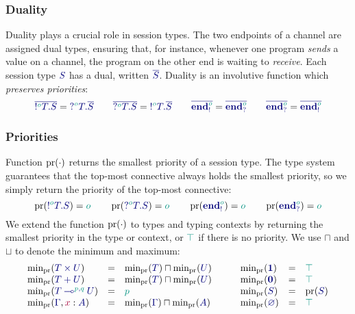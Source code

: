 \documentclass[main.tex]{subfiles}
\begin{document}
\subsubsection*{Duality}
Duality plays a crucial role in session types. The two endpoints of a channel are assigned dual types, ensuring that, for instance, whenever one program \emph{sends} a value on a channel, the program on the other end is waiting to \emph{receive}. Each session type $\ty{S}$ has a dual, written $\ty{\co{S}}$. Duality is an involutive function which \emph{preserves priorities}:
\[
  \ty{\co{\tysend[\cs{o}]{T}{S}}} = \ty{\tyrecv[\cs{o}]{T}{\co{S}}}
  \qquad
  \ty{\co{\tyrecv[\cs{o}]{T}{S}}} = \ty{\tysend[\cs{o}]{T}{\co{S}}}
  \qquad
  \ty{\co{\tyends[\cs{o}]}} = \ty{\co{\tyendr[\cs{o}]}}
  \qquad
  \ty{\co{\tyendr[\cs{o}]}} = \ty{\co{\tyends[\cs{o}]}}
\]

\subsubsection*{Priorities}
Function $\operatorname{pr}(\cdot)$ returns the smallest priority of a session type. The type system guarantees that the top-most connective always holds the smallest priority, so we simply return the priority of the top-most connective:
\[
  \pr(\ty{\tysend[\cs{o}]{T}{S}}) = \cs{o}
  \qquad
  \pr(\ty{\tyrecv[\cs{o}]{T}{S}}) = \cs{o}
  \qquad
  \pr(\ty{\tyends[\cs{o}]})       = \cs{o}
  \qquad
  \pr(\ty{\tyendr[\cs{o}]})       = \cs{o}
\]
We extend the function $\operatorname{pr}(\cdot)$ to types and typing contexts by returning the smallest priority in the type or context, or $\cs{\top}$ if there is no priority. We use $\sqcap$ and $\sqcup$ to denote the minimum and maximum:
\[
\begin{array}{lcl}
  \minpr(\ty{\typrod{T}{U}})                 & = & \minpr({\ty{T}})\sqcap\minpr({\ty{U}}) \\
  \minpr(\ty{\tysum{T}{U}})                  & = & \minpr({\ty{T}})\sqcap\minpr({\ty{U}}) \\
  \minpr(\ty{\tylolli[\cs{p},\cs{q}]{T}{U}}) & = & \cs{p} \\
  \minpr(\ty{\Gamma}, \tmty{x}{A})           & = & \minpr(\ty{\Gamma})\sqcap\minpr(\ty{A})
\end{array}
\qquad
\begin{array}{lcl}
  \minpr(\ty{\tyunit})                       & = & \ptop \\
  \minpr(\ty{\tyvoid})                       & = & \ptop \\
  \minpr(\ty{S})                             & = & \pr(\ty{S}) \\
  \minpr(\ty{\emptyenv})                     & = & \ptop
\end{array}
\]
\end{document}
